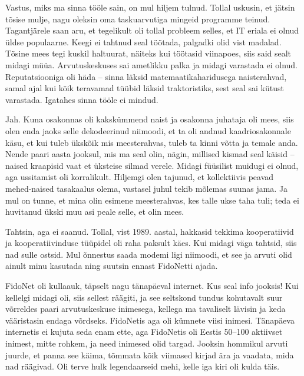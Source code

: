 Vastus, miks ma sinna tööle sain, on mul hiljem 
tulnud. Tollal uskusin, et jätsin tõsise mulje, nagu oleksin oma 
taskuarvutiga mingeid programme teinud. Tagantjärele saan aru, et tegelikult oli tollal probleem selles, et IT eriala ei olnud üldse 
populaarne. Keegi ei tahtnud seal töötada, palgadki olid vist madalad. Tõsine 
mees tegi kuskil haltuurat, näiteks kui töötasid viinapoes, siis said 
sealt midagi müüa. Arvutuskeskuses sai ametlikku 
palka ja midagi varastada ei olnud. Reputatsiooniga oli häda -- sinna läksid 
matemaatikaharidusega naisterahvad, samal ajal kui kõik teravamad 
tüübid läksid traktoristiks, sest seal sai kütust varastada. 
Igatahes sinna tööle ei mindud. 


Jah. Kuna osakonnas oli kakskümmend naist ja osakonna 
juhataja oli mees, siis olen enda jaoks selle dekodeerinud niimoodi, 
et ta oli andnud kaadriosakonnale käsu, et kui tuleb ükskõik mis meesterahvas, 
tuleb ta kinni võtta ja temale anda. Nende paari aasta jooksul, mis 
ma seal olin, nägin, millised kismad seal käisid -- naised kraapisid vaat et
üksteise silmad verele. Midagi füüsilist muidugi ei olnud, aga ussitamist oli 
korralikult. Hiljemgi olen tajunud, et kollektiivis peavad 
mehed-naised tasakaalus olema, vastasel juhul tekib mõlemas suunas
jama. Ja mul on tunne, et mina olin esimene meesterahvas, kes talle ukse taha 
tuli; teda ei huvitanud ükski muu asi peale selle, et olin mees. 


Tahtsin, aga ei saanud. Tollal, vist 1989. aastal, hakkasid tekkima
kooperatiivid ja kooperatiivinduse tüüpidel oli raha 
paksult käes. Kui midagi väga tahtsid, siis nad sulle ostsid. Mul 
õnnestus saada modemi ligi niimoodi, et see ja arvuti olid ainult minu kasutada ning suutsin ennast FidoNetti ajada.

FidoNet oli 
kullaauk, täpselt nagu tänapäeval internet. Kus seal info jooksis! 
Kui kellelgi midagi oli, siis sellest räägiti, ja see seltskond tundus 
kohutavalt suur võrreldes paari arvutuskeskuse inimesega, kellega ma 
tavaliselt lävisin ja keda vääristasin endaga võrdseks. FidoNetis aga oli 
kümnete viisi inimesi. Tänapäeva internetis ei kujuta seda enam ette, aga FidoNetis oli Eestis 
50--100 aktiivset inimest, mitte rohkem, ja need inimesed 
olid targad. Jooksin hommikul arvuti juurde, et panna see käima, tõmmata 
kõik viimased kirjad ära ja vaadata, mida nad räägivad. Oli terve hulk 
legendaarseid mehi, kelle iga kiri oli kulda täis.

